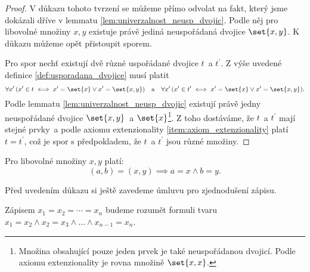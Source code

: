 \begin{proof}
    V důkazu tohoto tvrzení se můžeme přímo odvolat na fakt, který jsme dokázali dříve v lemmatu \ref{lem:univerzalnost_neusp_dvojic}. Podle něj pro libovolné množiny $x,y$ existuje právě jediná neuspořádaná dvojice $\set{x,y}$. K důkazu můžeme opět přistoupit sporem.\par
    Pro spor nechť existují dvě různé uspořádané dvojice $t$~a $t^\prime$. Z výše uvedené definice \ref{def:usporadana_dvojice} musí platit
    \begin{equation*}
        \forall x^\prime\,(x^\prime\in t \iff x^\prime=\set{x} \lor x^\prime=\set{x,y})\quad\text{a}\quad \forall x^\prime\,(x^\prime\in t^\prime \iff x^\prime=\set{x} \lor x^\prime=\set{x,y}).
    \end{equation*}
    Podle lemmatu \ref{lem:univerzalnost_neusp_dvojic} existují právě jedny neuspořádané dvojice $\set{x,y}$~a $\set{x}$\footnote{Množina obsahující pouze jeden prvek je také neuspořádanou dvojicí. Podle axiomu extenzionality je rovna množině $\set{x,x}$.}. Z toho dostáváme, že $t$~a $t^\prime$ mají stejné prvky~a podle axiomu extenzionality \ref{item:axiom_extenzionality} platí $t=t^\prime$, což je spor s předpokladem, že $t$~a $t^\prime$ jsou různé množiny.
\end{proof}
\begin{lemma}\label{lem:vlastnost_usp_dvojic}
    Pro libovolné množiny $x,y$ platí:
    \begin{equation*}
        (a,b)=(x,y) \implies a=x \land b=y.
    \end{equation*}
\end{lemma}
Před uvedením důkazu si ještě zavedeme úmluvu pro zjednodušení zápisu.
\begin{convention}
    Zápisem $x_1=x_2=\cdots=x_n$ budeme rozumět formuli tvaru $x_1=x_2 \land x_2=x_3 \land \dots \land x_{n-1}=x_n$.
\end{convention}
